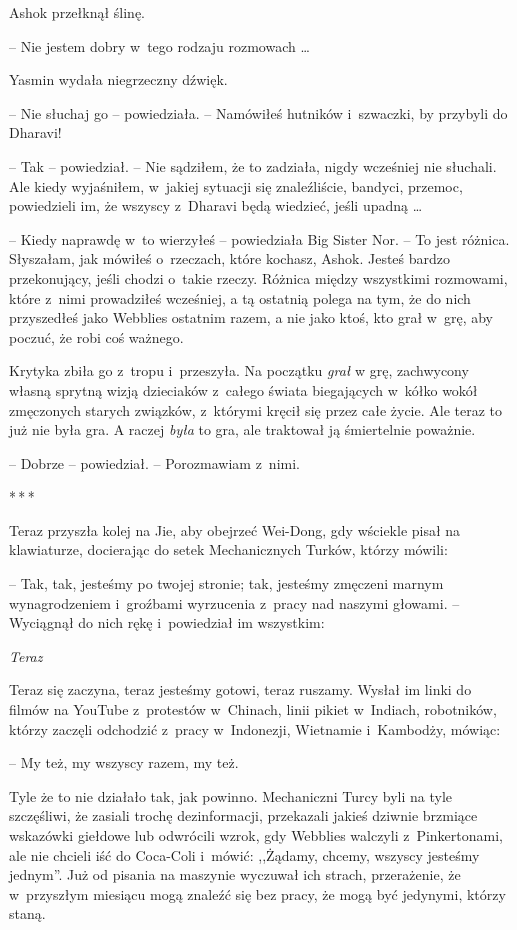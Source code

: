 \documentclass[oneside,polish,11pt,rmheadings]{mwbk}
\newcommand{\threeast}{\par\centerline{*\,*\,*}\medskip\par}
\begin{document}
Ashok przełknął ślinę. 

-- Nie jestem dobry w~tego rodzaju rozmowach \ldots 

Yasmin wydała niegrzeczny dźwięk. 

-- Nie słuchaj go -- powiedziała. -- Namówiłeś hutników i~szwaczki, by przybyli do Dharavi!

-- Tak -- powiedział. -- Nie sądziłem, że to zadziała, nigdy wcześniej nie słuchali. Ale kiedy wyjaśniłem, w~jakiej sytuacji się znaleźliście, bandyci, przemoc, powiedzieli im, że wszyscy z~Dharavi będą wiedzieć, jeśli upadną \ldots  

-- Kiedy naprawdę w~to wierzyłeś -- powiedziała Big Sister Nor. -- To jest różnica. Słyszałam, jak mówiłeś o~rzeczach, które kochasz, Ashok. Jesteś bardzo przekonujący, jeśli chodzi o~takie rzeczy. Różnica między wszystkimi rozmowami, które z~nimi prowadziłeś wcześniej, a tą ostatnią polega na tym, że do nich przyszedłeś jako Webblies ostatnim razem, a nie jako ktoś, kto grał w~grę, aby poczuć, że robi coś ważnego. 

Krytyka zbiła go z~tropu i~przeszyła. Na początku \textit{grał }w grę, zachwycony własną sprytną wizją dzieciaków z~całego świata biegających w~kółko wokół zmęczonych starych związków, z~którymi kręcił się przez całe życie. Ale teraz to już nie była gra. A raczej \textit{była }to gra, ale traktował ją śmiertelnie poważnie.

-- Dobrze -- powiedział. -- Porozmawiam z~nimi.

\bigskip
\threeast

Teraz przyszła kolej na Jie, aby obejrzeć Wei-Dong, gdy wściekle pisał na klawiaturze, docierając do setek Mechanicznych Turków, którzy mówili: 

-- Tak, tak, jesteśmy po twojej stronie; tak, jesteśmy zmęczeni marnym wynagrodzeniem i~groźbami wyrzucenia z~pracy nad naszymi głowami. -- Wyciągnął do nich rękę i~powiedział im wszystkim:

\textit{Teraz}

Teraz się zaczyna, teraz jesteśmy gotowi, teraz ruszamy. Wysłał im linki do filmów na YouTube z~protestów w~Chinach, linii pikiet w~Indiach, robotników, którzy zaczęli odchodzić z~pracy w~Indonezji, Wietnamie i~Kambodży, mówiąc: 

-- My też, my wszyscy razem, my też.

Tyle że to nie działało tak, jak powinno. Mechaniczni Turcy byli na tyle szczęśliwi, że zasiali trochę dezinformacji, przekazali jakieś dziwnie brzmiące wskazówki giełdowe lub odwrócili wzrok, gdy Webblies walczyli z~Pinkertonami, ale nie chcieli iść do Coca-Coli i~mówić: ,,Żądamy, chcemy, wszyscy jesteśmy jednym''. Już od pisania na maszynie wyczuwał ich strach, przerażenie, że w~przyszłym miesiącu mogą znaleźć się bez pracy, że mogą być jedynymi, którzy staną.
\end{document}

